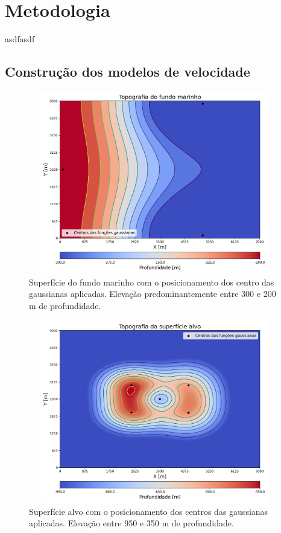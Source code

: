 \chapter{Metodologia}
\label{ch:metodologia}

asdfasdf

\section{Construção dos modelos de velocidade}

\begin{figure}[H]
	\centering
	\includegraphics[width=11cm,height=8cm]{Imgs/Metodologia/water_bottom_surface_gaussian.png}
	\caption{Superfície do fundo marinho com o posicionamento dos centro das gaussianas aplicadas. Elevação predominantemente entre 300 e 200 m de profundidade.}
	\label{fig:water_bottom_surface_gaussian}	
\end{figure}


\begin{figure}[H]
	\centering
	\includegraphics[width=11cm,height=8cm]{Imgs/Metodologia/target_surface_gaussian.png}
	\caption{Superfície alvo com o posicionamento dos centros das gaussianas aplicadas. Elevação entre 950 e 350 m de profundidade.}
	\label{fig:target_surface_gaussian.png}	
\end{figure}


